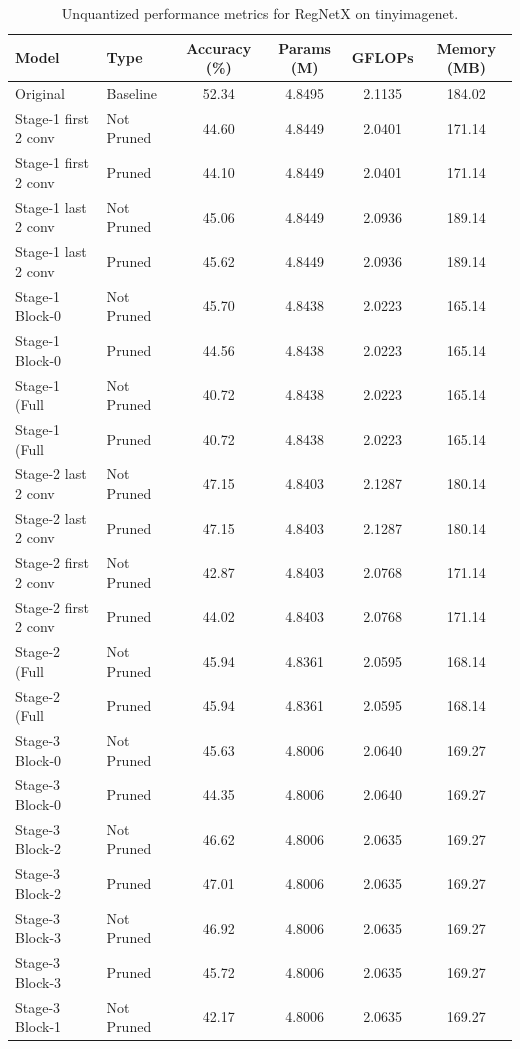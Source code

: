 \begin{table}
\caption{Unquantized performance metrics for RegNetX on tinyimagenet.}
\label{tab:RegNetX_tinyimagenet_unquant}
\begin{tabular}{llcccc}
\toprule
Model & Type & Accuracy (\%) & Params (M) & GFLOPs & Memory (MB) \\
\midrule
Original & Baseline & 52.34 & 4.8495 & 2.1135 & 184.02 \\
Stage-1 first 2 conv & Not Pruned & 44.60 & 4.8449 & 2.0401 & 171.14 \\
Stage-1 first 2 conv & Pruned & 44.10 & 4.8449 & 2.0401 & 171.14 \\
Stage-1 last 2 conv & Not Pruned & 45.06 & 4.8449 & 2.0936 & 189.14 \\
Stage-1 last 2 conv & Pruned & 45.62 & 4.8449 & 2.0936 & 189.14 \\
Stage-1 Block-0 & Not Pruned & 45.70 & 4.8438 & 2.0223 & 165.14 \\
Stage-1 Block-0 & Pruned & 44.56 & 4.8438 & 2.0223 & 165.14 \\
Stage-1 (Full & Not Pruned & 40.72 & 4.8438 & 2.0223 & 165.14 \\
Stage-1 (Full & Pruned & 40.72 & 4.8438 & 2.0223 & 165.14 \\
Stage-2 last 2 conv & Not Pruned & 47.15 & 4.8403 & 2.1287 & 180.14 \\
Stage-2 last 2 conv & Pruned & 47.15 & 4.8403 & 2.1287 & 180.14 \\
Stage-2 first 2 conv & Not Pruned & 42.87 & 4.8403 & 2.0768 & 171.14 \\
Stage-2 first 2 conv & Pruned & 44.02 & 4.8403 & 2.0768 & 171.14 \\
Stage-2 (Full & Not Pruned & 45.94 & 4.8361 & 2.0595 & 168.14 \\
Stage-2 (Full & Pruned & 45.94 & 4.8361 & 2.0595 & 168.14 \\
Stage-3 Block-0 & Not Pruned & 45.63 & 4.8006 & 2.0640 & 169.27 \\
Stage-3 Block-0 & Pruned & 44.35 & 4.8006 & 2.0640 & 169.27 \\
Stage-3 Block-2 & Not Pruned & 46.62 & 4.8006 & 2.0635 & 169.27 \\
Stage-3 Block-2 & Pruned & 47.01 & 4.8006 & 2.0635 & 169.27 \\
Stage-3 Block-3 & Not Pruned & 46.92 & 4.8006 & 2.0635 & 169.27 \\
Stage-3 Block-3 & Pruned & 45.72 & 4.8006 & 2.0635 & 169.27 \\
Stage-3 Block-1 & Not Pruned & 42.17 & 4.8006 & 2.0635 & 169.27 \\

\end{tabular}
\end{table}
